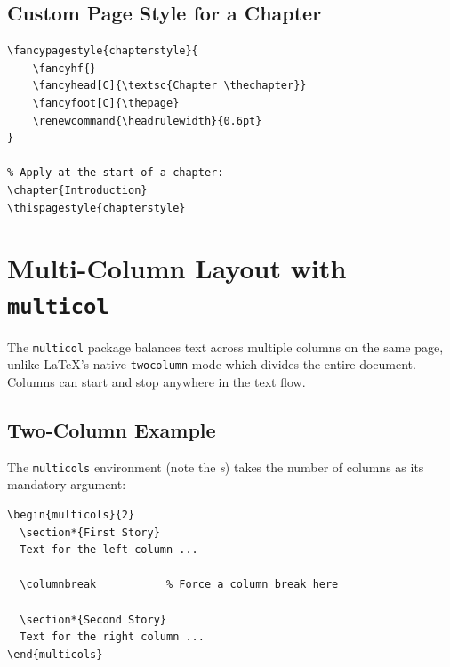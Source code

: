 \documentclass[12pt,a4paper,twoside]{article}
\renewcommand{\headrulewidth}{0.4pt}
\renewcommand{\headrulewidth}{0pt}
\begin{document}
\subsection{Custom Page Style for a Chapter}

\begin{verbatim}
\fancypagestyle{chapterstyle}{
    \fancyhf{}
    \fancyhead[C]{\textsc{Chapter \thechapter}}
    \fancyfoot[C]{\thepage}
    \renewcommand{\headrulewidth}{0.6pt}
}

% Apply at the start of a chapter:
\chapter{Introduction}
\thispagestyle{chapterstyle}
\end{verbatim}

\lipsum[2]


\section{Multi-Column Layout with \texttt{multicol}}
\label{sec:multicol}

The \texttt{multicol} package balances text across multiple columns on the
same page, unlike \LaTeX's native \texttt{twocolumn} mode which divides the
entire document. Columns can start and stop anywhere in the text flow.

\subsection{Two-Column Example}

The \verb|multicols| environment (note the \emph{s}) takes the number of
columns as its mandatory argument:

\begin{verbatim}
\begin{multicols}{2}
  \section*{First Story}
  Text for the left column ...

  \columnbreak           % Force a column break here

  \section*{Second Story}
  Text for the right column ...
\end{multicols}
\end{verbatim}
\end{document}
